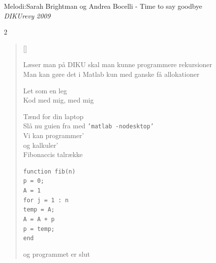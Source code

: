{Melodi:Sarah Brightman og Andrea Bocelli - Time to say goodbye}\\[.2em]
{\small\itshape DIKUrevy 2009}
\begin{multicols}2
\settowidth{\versewidth}{Læser man på DIKU skal man kunne programmere rekursioner}
\begin{verse}[\versewidth]


Læser man på DIKU skal man kunne programmere rekursioner\\
Man kan gøre det i Matlab kun med ganske få allokationer

Let som en leg\\
Kod med mig, med mig

Tænd for din laptop\\
Slå nu guien fra med \texttt{'matlab -nodesktop'}\\
Vi kan programmer'\\
og kalkuler'\\
Fibonaccis talrække

\texttt{function fib(n)}\\
\hspace*{3mm}\texttt{p = 0;}\\
\hspace*{3mm}\texttt{A = 1}\\
\hspace*{3mm}\texttt{for j = 1 : n}\\
\hspace*{3mm}\hspace*{3mm}\texttt{temp = A;}\\
\hspace*{3mm}\hspace*{3mm}\texttt{A = A + p}\\
\hspace*{3mm}\hspace*{3mm}\texttt{p = temp;}\\
\hspace*{3mm}\texttt{end}

og programmet er slut
\end{verse}
\end{multicols}

